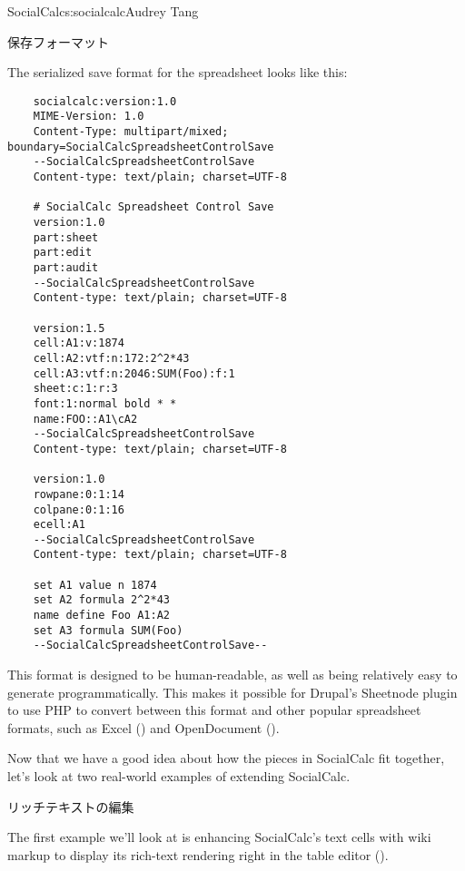 \begin{aosachapter}{SocialCalc}{s:socialcalc}{Audrey Tang}
\begin{aosasect1}{保存フォーマット}

The serialized save format for the spreadsheet looks like this:

\begin{verbatim}
    socialcalc:version:1.0
    MIME-Version: 1.0
    Content-Type: multipart/mixed; boundary=SocialCalcSpreadsheetControlSave
    --SocialCalcSpreadsheetControlSave
    Content-type: text/plain; charset=UTF-8

    # SocialCalc Spreadsheet Control Save
    version:1.0
    part:sheet
    part:edit
    part:audit
    --SocialCalcSpreadsheetControlSave
    Content-type: text/plain; charset=UTF-8

    version:1.5
    cell:A1:v:1874
    cell:A2:vtf:n:172:2^2*43
    cell:A3:vtf:n:2046:SUM(Foo):f:1
    sheet:c:1:r:3
    font:1:normal bold * *
    name:FOO::A1\cA2
    --SocialCalcSpreadsheetControlSave
    Content-type: text/plain; charset=UTF-8

    version:1.0
    rowpane:0:1:14
    colpane:0:1:16
    ecell:A1
    --SocialCalcSpreadsheetControlSave
    Content-type: text/plain; charset=UTF-8

    set A1 value n 1874
    set A2 formula 2^2*43
    name define Foo A1:A2
    set A3 formula SUM(Foo)
    --SocialCalcSpreadsheetControlSave--
\end{verbatim}

\noindent This format is designed to be human-readable, as well as being
relatively easy to generate programmatically.  This makes it possible
for Drupal's Sheetnode plugin to use PHP to convert
between this format and other popular spreadsheet formats, such as
Excel () and OpenDocument ().

Now that we have a good idea about how the pieces in SocialCalc fit
together, let's look at two real-world examples of extending
SocialCalc.

\end{aosasect1}

\begin{aosasect1}{リッチテキストの編集}

The first example we'll look at is enhancing SocialCalc's text cells
with wiki markup to display its rich-text rendering right in the
table editor ().


\end{aosasect1}
\end{aosachapter}
